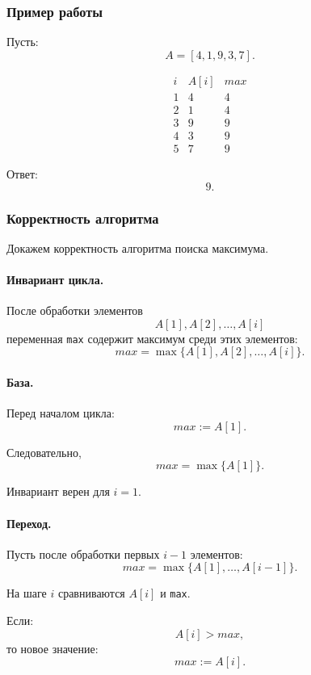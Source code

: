 \documentclass[12pt,a4paper]{article}
\begin{document}
\subsubsection{Пример работы}

Пусть:
\[
    A = [4, 1, 9, 3, 7].
\]

\[
\begin{array}{c|c|c}
i & A[i] & max\\
\hline
1 & 4 & 4\\
2 & 1 & 4\\
3 & 9 & 9\\
4 & 3 & 9\\
5 & 7 & 9
\end{array}
\]

Ответ:
\[
    9.
\]

\subsubsection{Корректность алгоритма}

Докажем корректность алгоритма поиска максимума.

\paragraph{Инвариант цикла.}

После обработки элементов
\[
    A[1], A[2], \dots, A[i]
\]
переменная \texttt{max} содержит максимум среди этих элементов:
\[
    max = \max\{A[1], A[2], \dots, A[i]\}.
\]

\paragraph{База.}

Перед началом цикла:
\[
    max := A[1].
\]

Следовательно,
\[
    max = \max\{A[1]\}.
\]

Инвариант верен для $i = 1$.

\paragraph{Переход.}

Пусть после обработки первых $i-1$ элементов:
\[
    max = \max\{A[1], \dots, A[i-1]\}.
\]

На шаге $i$ сравниваются $A[i]$ и \texttt{max}.

Если:
\[
    A[i] > max,
\]
то новое значение:
\[
    max := A[i].
\]
\end{document}
